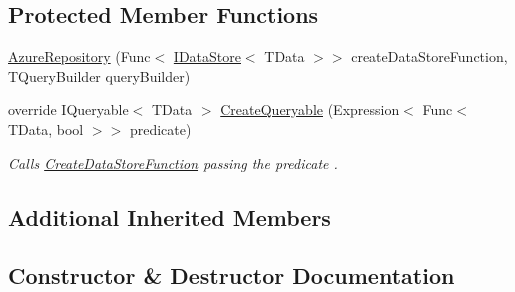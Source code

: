 \subsection*{Protected Member Functions}
\begin{DoxyCompactItemize}
\item 
\hyperlink{classCqrs_1_1Azure_1_1DocumentDb_1_1Repositories_1_1AzureRepository_a0cd5703c46fde3eeefcb02b1d0113640_a0cd5703c46fde3eeefcb02b1d0113640}{Azure\+Repository} (Func$<$ \hyperlink{interfaceCqrs_1_1DataStores_1_1IDataStore}{I\+Data\+Store}$<$ T\+Data $>$$>$ create\+Data\+Store\+Function, T\+Query\+Builder query\+Builder)
\item 
override I\+Queryable$<$ T\+Data $>$ \hyperlink{classCqrs_1_1Azure_1_1DocumentDb_1_1Repositories_1_1AzureRepository_ac9ceeed80a02ced9a45b3443cd1f453f_ac9ceeed80a02ced9a45b3443cd1f453f}{Create\+Queryable} (Expression$<$ Func$<$ T\+Data, bool $>$$>$ predicate)
\begin{DoxyCompactList}\small\item\em Calls \hyperlink{classCqrs_1_1Repositories_1_1Repository_ae15cee6394a223564ad2ead65cd30189_ae15cee6394a223564ad2ead65cd30189}{Create\+Data\+Store\+Function} passing the {\itshape predicate} . \end{DoxyCompactList}\end{DoxyCompactItemize}
\subsection*{Additional Inherited Members}


\subsection{Constructor \& Destructor Documentation}
\mbox{\label{classCqrs_1_1Azure_1_1DocumentDb_1_1Repositories_1_1AzureRepository_a0cd5703c46fde3eeefcb02b1d0113640_a0cd5703c46fde3eeefcb02b1d0113640}} 
